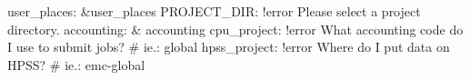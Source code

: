 \begin{DoxyCode}
user\_places: &user\_places
    PROJECT\_DIR: !error Please select a project directory.
accounting: & accounting
    cpu\_project: !error What accounting code \textcolor{keywordflow}{do} I use to submit jobs? # ie.: global
    hpss\_project: !error Where \textcolor{keywordflow}{do} I put data on HPSS?   # ie.: emc-global
\end{DoxyCode}
 